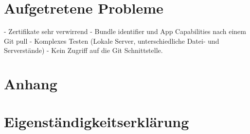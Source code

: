 \documentclass{article}
\begin{document}
\section{Aufgetretene Probleme}
- Zertifikate sehr verwirrend
- Bundle identifier und App Capabilities nach einem Git pull
- Komplexes Testen (Lokale Server, unterschiedliche Datei- und Serverstände) 
- Kein Zugriff auf die Git Schnittstelle.



\newpage
\section{Anhang}
\begin{figure}[h]
\end{figure}

\newpage
\section{Eigenständigkeitserklärung}
\end{document}
